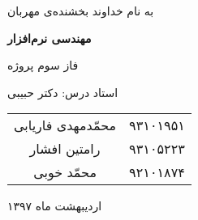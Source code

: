 \begin{center}
\large
به نام خداوند بخشنده‌ی مهربان

\Huge
\vspace*{3cm}
\textbf{مهندسی نرم‌افزار}

\vspace*{1cm}
\large
فاز سوم پروژه
\vspace*{3cm}

\Large
استاد درس: دکتر حبیبی
\vspace*{2cm}

\vspace*{1cm}

\begin{tabular}{cc}
 محمّدمهدی فاریابی
	& 
۹۳۱۰۱۹۵۱
	\\
رامتین افشار
	&
۹۳۱۰۵۲۲۳
	 \\
محمّد خوبی
	&
۹۲۱۰۱۸۷۴
	 \\
\end{tabular}

 

\vspace*{3cm} 
\large

اردیبهشت ماه ۱۳۹۷
\vspace*{5cm}

\end{center}
\newpage

